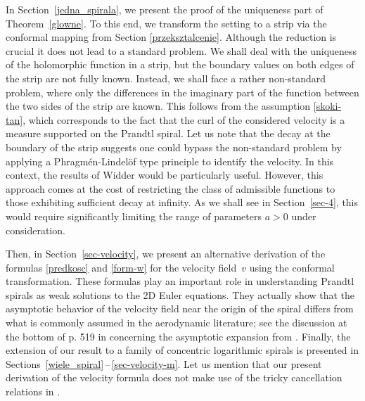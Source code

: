 \documentclass[11pt, letterpaper, reqno]{amsart}
\numberwithin{equation}{section}
\theoremstyle{definition}
\theoremstyle{plain}
\numberwithin{equation}{section}
\begin{document}
In Section~\ref{jedna_spirala}, we present the proof of the uniqueness part of Theorem~\ref{glowne}. To this end, we transform the setting to a strip via the conformal mapping from Section \ref{przeksztalcenie}. Although the reduction is crucial it does not lead to a standard problem. We shall deal with the uniqueness of the holomorphic function in a strip, but the boundary values on both edges of the strip are not fully known. Instead, we shall face a rather non-standard problem, where only the differences in the imaginary part of the function between the two sides of the strip are known. This follows from the assumption \eqref{skoki-tan}, which corresponds to the fact that the curl of the considered velocity is a measure supported on the Prandtl spiral. Let us note that the decay at the boundary of the strip suggests one could bypass the non-standard problem by applying a Phragm\'en-Lindel\"{o}f type principle to identify the velocity. In this context, the results of Widder \cite{Widder} would be particularly useful. However, this approach comes at the cost of restricting the class of admissible functions to those exhibiting sufficient decay at infinity. As we shall see in Section~\ref{sec-4}, this would require significantly limiting the range of parameters $a>0$ under consideration.  

Then, in Section~\ref{sec-velocity}, we present an alternative derivation of the formulas \eqref{predkosc} and \eqref{form-w} for the velocity field~$v$ using the conformal transformation. These formulas play an important role in understanding Prandtl spirals as weak solutions to the 2D Euler equations. They actually show that the asymptotic behavior of the velocity field near the origin of the spiral differs from what is commonly assumed in the aerodynamic literature; see the discussion at the bottom of p. 519 in \cite{CKO} concerning the asymptotic expansion from \cite{saffman}. Finally, the extension of our result to a family of concentric logarithmic spirals is presented in Sections~\ref{wiele_spiral}\,--\,\ref{sec-velocity-m}. Let us mention that our present derivation of the velocity formula does not make use of the tricky cancellation relations in \cite{Elling}.
\end{document}
